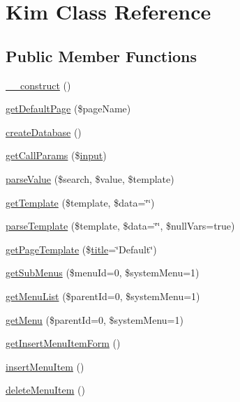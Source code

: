 \hypertarget{classKim}{}\section{Kim Class Reference}
\label{classKim}
\subsection*{Public Member Functions}
\begin{DoxyCompactItemize}
\item 
\hyperlink{classKim_a23fe2ba2b5a76fe09200e2f0fbded794}{\+\_\+\+\_\+construct} ()
\item 
\hyperlink{classKim_a8a754c69958e71d159e6808f83f12cfe}{get\+Default\+Page} (\$page\+Name)
\item 
\hyperlink{classKim_ae9db930151f99235866c68fd96208cd8}{create\+Database} ()
\item 
\hyperlink{classKim_adbe9f842961805e68a08df04c4c58dfd}{get\+Call\+Params} (\$\hyperlink{Shape_8php_a6210da308e7ce036a6362dca3018d6db}{input})
\item 
\hyperlink{classKim_ae401f319dd0148a194304c54e19d6c1e}{parse\+Value} (\$search, \$value, \$template)
\item 
\hyperlink{classKim_ae484524c4622734ede53894ae89a669a}{get\+Template} (\$template, \$data=\char`\"{}\char`\"{})
\item 
\hyperlink{classKim_aff31f9e7bee71022c9edd8d3661e9aa9}{parse\+Template} (\$template, \$data=\char`\"{}\char`\"{}, \$null\+Vars=true)
\item 
\hyperlink{classKim_a3cb9fd00227b180b8118257b85acf6ff}{get\+Page\+Template} (\$\hyperlink{Shape_8php_ad264ad0cabbe965bf7f7c8a5ed6abebb}{title}=\char`\"{}Default\char`\"{})
\item 
\hyperlink{classKim_a76d369e52b95a9cabdb45c793d3eee45}{get\+Sub\+Menus} (\$menu\+Id=0, \$system\+Menu=1)
\item 
\hyperlink{classKim_ad7f2c106626bd9e83f1a4f76303a6e45}{get\+Menu\+List} (\$parent\+Id=0, \$system\+Menu=1)
\item 
\hyperlink{classKim_ac4c6f020c4abed55574cc4515b8c1b01}{get\+Menu} (\$parent\+Id=0, \$system\+Menu=1)
\item 
\hyperlink{classKim_a7391f7a7d90adef0a048f2679aaa27fd}{get\+Insert\+Menu\+Item\+Form} ()
\item 
\hyperlink{classKim_a03aa4a733e4539d175df84011ad1cb9a}{insert\+Menu\+Item} ()
\item 
\hyperlink{classKim_ab0a2f80e33b3d6ed654fbf6b8cf55291}{delete\+Menu\+Item} ()

\end{DoxyCompactItemize}
